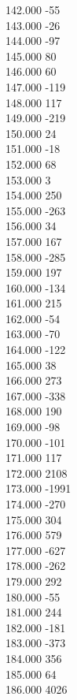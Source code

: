 { 142.000	-55 \\
 143.000	-26 \\
 144.000	-97 \\
 145.000	80 \\
 146.000	60 \\
 147.000	-119 \\
 148.000	117 \\
 149.000	-219 \\
 150.000	24 \\
 151.000	-18 \\
 152.000	68 \\
 153.000	3 \\
 154.000	250 \\
 155.000	-263 \\
 156.000	34 \\
 157.000	167 \\
 158.000	-285 \\
 159.000	197 \\
 160.000	-134 \\
 161.000	215 \\
 162.000	-54 \\
 163.000	-70 \\
 164.000	-122 \\
 165.000	38 \\
 166.000	273 \\
 167.000	-338 \\
 168.000	190 \\
 169.000	-98 \\
 170.000	-101 \\
 171.000	117 \\
 172.000	2108 \\
 173.000	-1991 \\
 174.000	-270 \\
 175.000	304 \\
 176.000	579 \\
 177.000	-627 \\
 178.000	-262 \\
 179.000	292 \\
 180.000	-55 \\
 181.000	244 \\
 182.000	-181 \\
 183.000	-373 \\
 184.000	356 \\
 185.000	64 \\
 186.000	4026 \\
}
